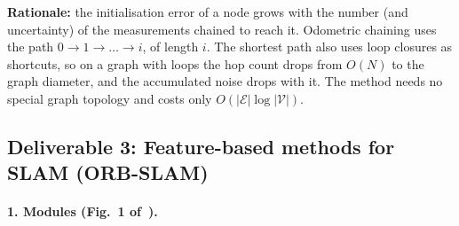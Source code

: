 \textbf{Rationale:} the initialisation error of a node grows with the number (and
uncertainty) of the measurements chained to reach it. Odometric chaining uses the path
$0\to1\to\dots\to i$, of length $i$. The shortest path also uses loop closures as
shortcuts, so on a graph with loops the hop count drops from $O(N)$ to the graph diameter,
and the accumulated noise drops with it. The method needs no special graph topology and
costs only $O(|\mathcal{E}|\log|\mathcal{V}|)$.

\subsection{Deliverable 3: Feature-based methods for SLAM (ORB-SLAM)}\label{sec:d3}

\paragraph{1. Modules (Fig.~1 of~\cite{murartal2015orb}).}
